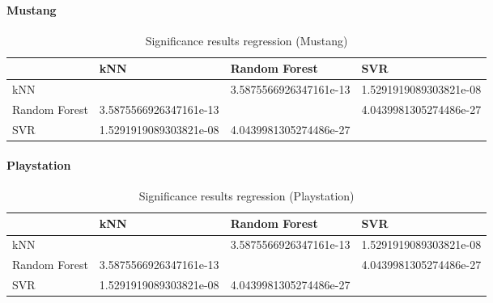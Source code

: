 \paragraph{Mustang}
\begin{table}[h]
	\begin{center}
	\begin{tabular}{| p{3.25cm} || p{3.25cm} | p{3.25cm} | p{3.25cm} |}
		\hline
		& kNN & Random Forest & SVR \\
		\hline \hline
		kNN & & 3.5875566926347161e-13 & 1.5291919089303821e-08 \\
		\hline
		Random Forest & 3.5875566926347161e-13 & & 4.0439981305274486e-27 \\
		\hline
		SVR & 1.5291919089303821e-08 & 4.0439981305274486e-27 & \\
		\hline
	\end{tabular}
	\end{center}
	\caption{Significance results regression (Mustang)}
	\label{tab_commission}
\end{table}
\paragraph{Playstation}
\begin{table}[h]
	\begin{center}
	\begin{tabular}{| p{3.25cm} || p{3.25cm} | p{3.25cm} | p{3.25cm} |}
		\hline
		& kNN & Random Forest & SVR \\
		\hline \hline
		kNN & & 3.5875566926347161e-13 & 1.5291919089303821e-08 \\
		\hline
		Random Forest & 3.5875566926347161e-13 & & 4.0439981305274486e-27 \\
		\hline
		SVR & 1.5291919089303821e-08 & 4.0439981305274486e-27 & \\
		\hline
	\end{tabular}
	\end{center}
	\caption{Significance results regression (Playstation)}
	\label{tab_commission}
\end{table}
